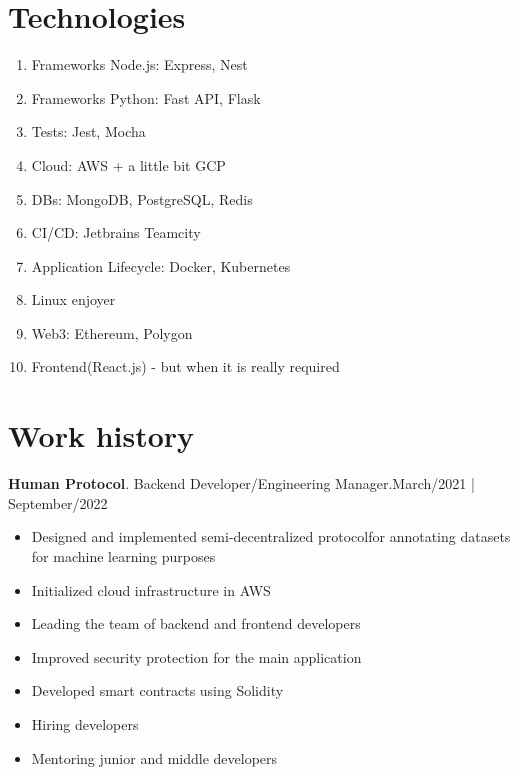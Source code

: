 \documentclass{article}
\begin{document}
\vspace{-2em}
\section*{Technologies}
\begin{multicols}{2}
    \begin{enumerate}
        \item Frameworks Node.js: Express, Nest
        \item Frameworks Python: Fast API, Flask
        \item Tests: Jest, Mocha
        \item Cloud: AWS + a little bit GCP
        \item DBs: MongoDB, PostgreSQL, Redis
        \item CI/CD: Jetbrains Teamcity
        \item Application Lifecycle: Docker, Kubernetes
        \item Linux enjoyer
        \item Web3: Ethereum, Polygon
        \item Frontend(React.js) - but when it is really required
    \end{enumerate}
\end{multicols}


\section*{Work history}

\textbf{Human Protocol}. Backend Developer/Engineering Manager.\hspace*{0pt}\hfill March/2021 | September/2022

\begin{itemize}
 \item Designed and implemented semi-decentralized protocolfor annotating datasets for machine learning purposes
 \item Initialized cloud infrastructure in AWS
 \item Leading the team of backend and frontend developers
 \item Improved security protection for the main application
 \item Developed smart contracts using Solidity
 \item Hiring developers
 \item Mentoring junior and middle developers
\end{itemize}
\end{document}
